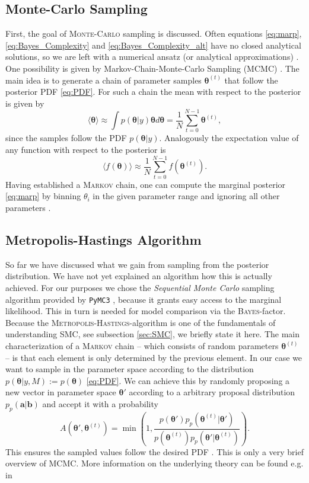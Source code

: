 \documentclass[%
 reprint,
 amsmath,amssymb,
 aps,
]{revtex4-1}
\newcommand{\btheta}{\boldsymbol{\theta}}
\begin{document}
 \subsection{Monte-Carlo Sampling}
\noindent First, the goal of \textsc{Monte-Carlo} sampling is discussed. Often equations \eqref{eq:marp}, \eqref{eq:Bayes_Complexity} and \eqref{eq:Bayes_Complexity_alt} have no closed analytical solutions, so we are left with a numerical ansatz (or analytical approximations) \cite{Toussaint}. One possibility is given by Markov-Chain-Monte-Carlo Sampling (MCMC) {\color{red} \cite{??}}. The main idea is to generate a chain of parameter samples $\boldsymbol{\theta}^{(t)}$ that follow the posterior PDF \eqref{eq:PDF}. For such a chain the mean with respect to the posterior is given by 
 \begin{equation}
 	\langle \boldsymbol{\theta}\rangle\approx \int p(\boldsymbol{\theta} | y)\boldsymbol{\theta}d\boldsymbol{\theta}=\frac{1}{N}\sum_{t=0}^{N-1}\boldsymbol{\theta}^{(t)},
 \end{equation}
since the samples follow the PDF $p(\boldsymbol{\theta} | y)$. Analogously the expectation value of any function with respect to the posterior is
 \begin{equation}
	\langle f(\boldsymbol{\theta})\rangle\approx\frac{1}{N}\sum_{t=0}^{N-1}f(\boldsymbol{\theta}^{(t)}).
\end{equation}
Having established a \textsc{Markov} chain, one can compute the marginal posterior \eqref{eq:marp} by binning $\theta_i$ in the given parameter range and ignoring all other parameters \cite{Trotta_2008}. 

\subsection{Metropolis-Hastings Algorithm}
\noindent So far we have discussed what we gain from sampling from the posterior distribution. We have not yet explained an algorithm how this is actually achieved.  For our purposes we chose the \emph{Sequential Monte Carlo} sampling algorithm provided by \texttt{PyMC3} \cite{PyMC3_SMC}, because it grants easy access to the marginal likelihood. This in turn is needed for model comparison via the \textsc{Bayes}-factor. Because the \textsc{Metropolis-Hastings}-algorithm is one of the fundamentals of understanding SMC, see subsection \eqref{sec:SMC}, we briefly state it here. The main characterization of a \textsc{Markov} chain -- which consists of random parameters $\boldsymbol{\theta}^{(t)}$ -- is that each element is only determined by the previous element. In our case we want to sample in the parameter space according to the distribution $p(\btheta|y,M):=p(\btheta)$ \eqref{eq:PDF}. We can achieve this by randomly proposing a new vector in parameter space $\btheta'$  according to a arbitrary proposal distribution $p_p(\boldsymbol{a}|\boldsymbol{b})$ and accept it with a probability $$A(\btheta',\btheta^{(t)})=\min\left(1,\frac{p(\btheta')p_p(\btheta^{(t)}|\btheta')}{p(\btheta^{(t)})p_p(\btheta'|\btheta^{(t)})}\right).$$
This ensures the sampled values follow the desired PDF \cite{Toussaint}. This is only a very brief overview of MCMC. More information on the underlying theory can be found e.g. in \cite{neal}
\end{document}
